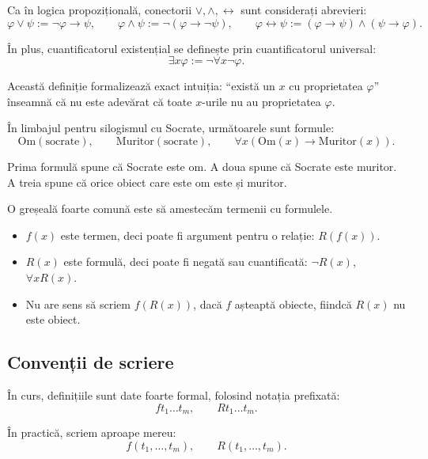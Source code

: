 Ca în logica propozițională, conectorii \( \lor, \land, \leftrightarrow \) sunt considerați abrevieri:
\[
	\varphi \lor \psi := \neg \varphi \to \psi,
	\qquad
	\varphi \land \psi := \neg(\varphi \to \neg \psi),
	\qquad
	\varphi \leftrightarrow \psi := (\varphi \to \psi) \land (\psi \to \varphi).
\]

În plus, cuantificatorul existențial se definește prin cuantificatorul universal:
\[
	\exists x \varphi := \neg \forall x \neg \varphi.
\]

Această definiție formalizează exact intuiția: ``există un \(x\) cu proprietatea \(\varphi\)''
înseamnă că nu este adevărat că toate \(x\)-urile nu au proprietatea \(\varphi\).

\begin{eg}
	În limbajul pentru silogismul cu Socrate, următoarele sunt formule:
	\[
		\mathrm{Om}(\mathrm{socrate}),
		\qquad
		\mathrm{Muritor}(\mathrm{socrate}),
		\qquad
		\forall x(\mathrm{Om}(x) \to \mathrm{Muritor}(x)).
	\]

	Prima formulă spune că Socrate este om. A doua spune că Socrate este muritor. A treia spune că orice obiect care este om este și muritor.
\end{eg}

\begin{note}
	O greșeală foarte comună este să amestecăm termenii cu formulele.

	\begin{itemize}
		\item \(f(x)\) este termen, deci poate fi argument pentru o relație: \(R(f(x))\).
		\item \(R(x)\) este formulă, deci poate fi negată sau cuantificată: \(\neg R(x)\), \(\forall x R(x)\).
		\item Nu are sens să scriem \(f(R(x))\), dacă \(f\) așteaptă obiecte, fiindcă \(R(x)\) nu este obiect.
	\end{itemize}
\end{note}

\subsection{Convenții de scriere}

În curs, definițiile sunt date foarte formal, folosind notația prefixată:
\[
	ft_1 \dots t_m, \qquad Rt_1 \dots t_m.
\]

În practică, scriem aproape mereu:
\[
	f(t_1, \dots, t_m), \qquad R(t_1, \dots, t_m).
\]

